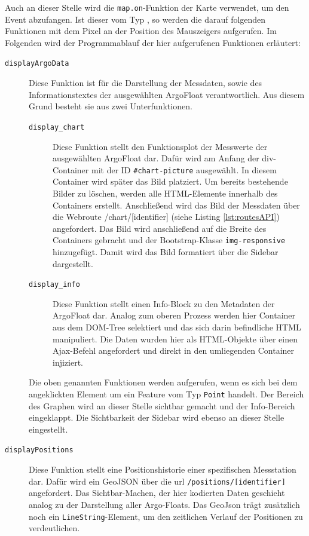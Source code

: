 Auch an dieser Stelle wird die \texttt{map.on}-Funktion der Karte verwendet, um den Event abzufangen. Ist dieser vom Typ , so werden die darauf folgenden Funktionen mit dem Pixel an der Position des Mauszeigers aufgerufen. Im Folgenden wird der Programmablauf der hier aufgerufenen Funktionen erläutert:

\begin{description}
 \item [\texttt{displayArgoData}]
    Diese Funktion ist für die Darstellung der Messdaten, sowie des Informationstextes der ausgewählten ArgoFloat verantwortlich. Aus diesem Grund besteht sie aus zwei Unterfunktionen.
    \begin{description}
    \item [\texttt{display\_chart}]
        Diese Funktion stellt den Funktionsplot der Messwerte der ausgewählten ArgoFloat dar. Dafür wird am Anfang der div-Container mit der ID \texttt{\#chart-picture} ausgewählt. In diesem Container wird später das Bild platziert. Um bereits bestehende Bilder zu löschen, werden alle HTML-Elemente innerhalb des Containers erstellt. Anschließend wird das Bild der Messdaten über die Webroute /chart/[identifier]  (siehe Listing \ref{lst:routesAPI}) angefordert. Das Bild wird anschließend auf die Breite des Containers gebracht und der Bootstrap-Klasse \texttt{img-responsive} hinzugefügt. Damit wird das Bild formatiert über die Sidebar dargestellt.
    \item [\texttt{display\_info}]
        Diese Funktion stellt einen Info-Block zu den Metadaten der ArgoFloat dar. Analog zum oberen Prozess werden hier Container aus dem DOM-Tree selektiert und das sich darin befindliche  \gls{HTML} manipuliert. Die Daten wurden hier als HTML-Objekte über einen Ajax-Befehl angefordert und direkt in den umliegenden Container injiziert.
    \end{description}

    Die oben genannten Funktionen werden aufgerufen, wenn es sich bei dem angeklickten Element um ein Feature vom Typ \texttt{Point} handelt. Der Bereich des Graphen wird an dieser Stelle sichtbar gemacht und der Info-Bereich eingeklappt. Die Sichtbarkeit der Sidebar wird ebenso an dieser Stelle eingestellt.

 \item [\texttt{displayPositions}]
    Diese Funktion stellt eine Positionshistorie einer spezifischen Messstation dar. Dafür wird ein GeoJSON über die url \texttt{/positions/[identifier]} angefordert. Das Sichtbar-Machen, der hier kodierten Daten geschieht analog zu der Darstellung aller Argo-Floats. Das GeoJson trägt zusätzlich noch ein \texttt{LineString}-Element, um den zeitlichen Verlauf der Positionen zu verdeutlichen.
\end{description}






